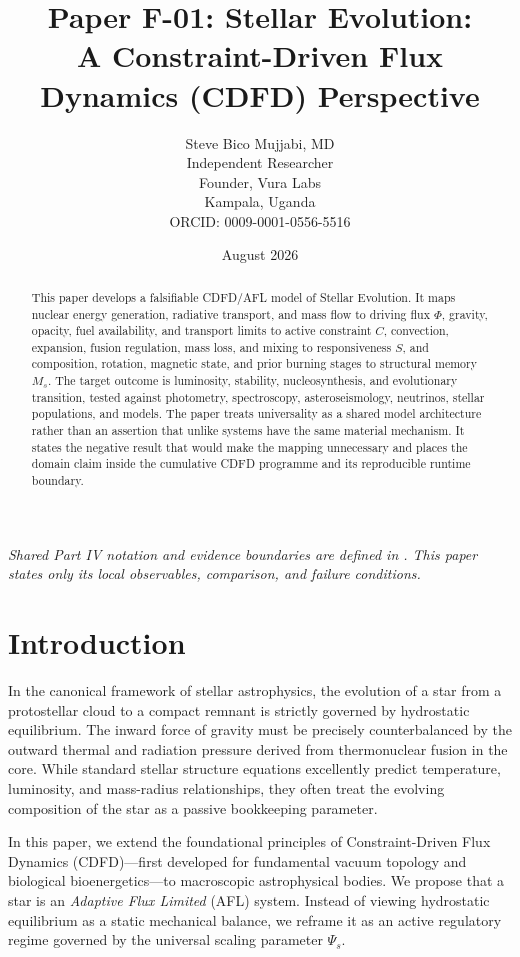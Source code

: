 \documentclass[11pt,a4paper]{article}
\title{\textbf{Paper F-01: Stellar Evolution:\\ A Constraint-Driven Flux Dynamics (CDFD) Perspective}}
\author{Steve Bico Mujjabi, MD\\
\small Independent Researcher\\
\small Founder, Vura Labs\\
\small Kampala, Uganda\\
\small ORCID: 0009-0001-0556-5516}
\date{August 2026}
\begin{document}
\maketitle

\noindent\textit{Shared Part IV notation and evidence boundaries are defined in . This paper states only its local observables, comparison, and failure conditions.}


\begin{abstract}
This paper develops a falsifiable CDFD/AFL model of Stellar Evolution. It maps nuclear energy generation, radiative transport, and mass flow to driving flux $\Phi$, gravity, opacity, fuel availability, and transport limits to active constraint $C$, convection, expansion, fusion regulation, mass loss, and mixing to responsiveness $S$, and composition, rotation, magnetic state, and prior burning stages to structural memory $M_s$. The target outcome is luminosity, stability, nucleosynthesis, and evolutionary transition, tested against photometry, spectroscopy, asteroseismology, neutrinos, stellar populations, and models. The paper treats universality as a shared model architecture rather than an assertion that unlike systems have the same material mechanism. It states the negative result that would make the mapping unnecessary and places the domain claim inside the cumulative CDFD programme and its reproducible runtime boundary.
\end{abstract}

\section{Introduction}

In the canonical framework of stellar astrophysics, the evolution of a star from a protostellar cloud to a compact remnant is strictly governed by hydrostatic equilibrium. The inward force of gravity must be precisely counterbalanced by the outward thermal and radiation pressure derived from thermonuclear fusion in the core. While standard stellar structure equations excellently predict temperature, luminosity, and mass-radius relationships, they often treat the evolving composition of the star as a passive bookkeeping parameter.

In this paper, we extend the foundational principles of Constraint-Driven Flux Dynamics (CDFD)---first developed for fundamental vacuum topology and biological bioenergetics---to macroscopic astrophysical bodies. We propose that a star is an \textit{Adaptive Flux Limited} (AFL) system. Instead of viewing hydrostatic equilibrium as a static mechanical balance, we reframe it as an active regulatory regime governed by the universal scaling parameter $\Psi_s$.
\end{document}

